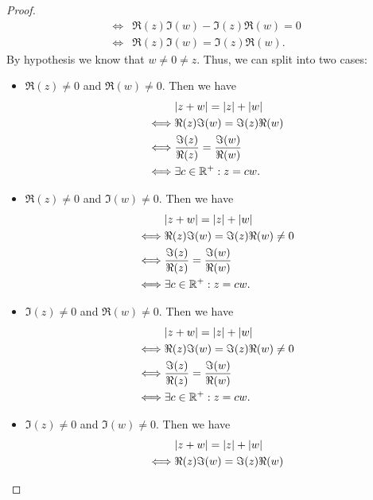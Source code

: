 \begin{proof}
\begin{align*}
    \iff & \Re(z) \Im(w) - \Im(z) \Re(w) = 0                                                                               \\
    \iff & \Re(z) \Im(w) = \Im(z) \Re(w).
  \end{align*}
  By hypothesis we know that \(w \neq 0 \neq z\).
  Thus, we can split into two cases:
  \begin{itemize}
    \item \(\Re(z) \neq 0\) and \(\Re(w) \neq 0\).
          Then we have
          \begin{align*}
                 & \abs{z + w} = \abs{z} + \abs{w}                 \\
            \iff & \Re(z) \Im(w) = \Im(z) \Re(w)                   \\
            \iff & \dfrac{\Im(z)}{\Re(z)} = \dfrac{\Im(w)}{\Re(w)} \\
            \iff & \exists c \in \R^+ : z = cw.
          \end{align*}
    \item \(\Re(z) \neq 0\) and \(\Im(w) \neq 0\).
          Then we have
          \begin{align*}
                 & \abs{z + w} = \abs{z} + \abs{w}                 \\
            \iff & \Re(z) \Im(w) = \Im(z) \Re(w) \neq 0            \\
            \iff & \dfrac{\Im(z)}{\Re(z)} = \dfrac{\Im(w)}{\Re(w)} \\
            \iff & \exists c \in \R^+ : z = cw.
          \end{align*}
    \item \(\Im(z) \neq 0\) and \(\Re(w) \neq 0\).
          Then we have
          \begin{align*}
                 & \abs{z + w} = \abs{z} + \abs{w}                 \\
            \iff & \Re(z) \Im(w) = \Im(z) \Re(w) \neq 0            \\
            \iff & \dfrac{\Im(z)}{\Re(z)} = \dfrac{\Im(w)}{\Re(w)} \\
            \iff & \exists c \in \R^+ : z = cw.
          \end{align*}
    \item \(\Im(z) \neq 0\) and \(\Im(w) \neq 0\).
          Then we have
          \begin{align*}
                 & \abs{z + w} = \abs{z} + \abs{w}                 \\
            \iff & \Re(z) \Im(w) = \Im(z) \Re(w)                   \\

\end{align*}
\end{itemize}
\end{proof}
